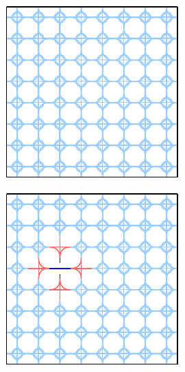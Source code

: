\begin{center}
    \captionsetup{type=figure}
    \begin{minipage}{.31\textwidth}
        \centering
        \includegraphics[width=0.95\linewidth]{img/WFC initial state.pdf}
         \label{fig:wfc-initial}
    \end{minipage}%
    \begin{minipage}{.31\textwidth}
        \centering
        \includegraphics[width=0.95\linewidth]{img/WFC step 1.pdf}

\end{minipage}
\end{center}
